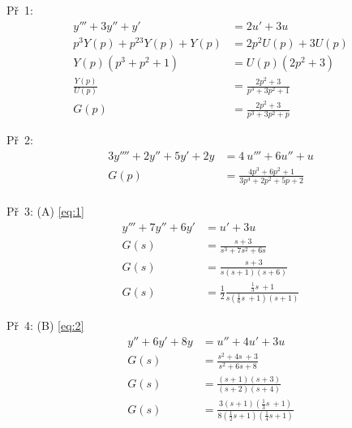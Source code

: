 

Př~1:
\begin{align}
y'''+3y''+y' & = 2u'+3u \\
p^3Y(p)+ p^23Y(p)+ Y(p) & = 2p^2U(p)+3U(p) \\
Y(p)(p^3+p^2+1) & = U(p)(2p^2+3) \\
\frac{Y(p)}{U(p)} & = \frac{2p^2+3}{p^3+3p^2+1} \\
G(p) & = \frac{2p^2 + 3} { p^3 + 3p^2 + p}
\end{align}

Př~2:
\begin{align}
3y''''+2y''+5y'+2y & = 4~u'''+6u''+u \\
G(p) & = \frac{4p^3+6p^2+1}{3p^4+2p^2+5p+2} \\
\end{align}

Př~3: (A) \ref{eq:1}
\begin{equation} \label{eq:1}
\begin{aligned}
y'''+7y''+6y' & = u'+3u \\
G(s) & = \frac{s+3}{s^3+7s^2+6s} \\
G(s) & = \frac{s+3}{s(s+1)(s+6)} \\
G(s) & = \frac12 \frac{\frac13 s~+ 1}{s (\frac16 s~+ 1) (s + 1)}
\end{aligned}
\end{equation}

Př~4: (B) \ref{eq:2}
\begin{align} \label{eq:2}
y'' + 6y'+8y &= u''+4u'+3u \\
G(s) & = \frac{s^2 + 4s~+ 3}{s^2+6s+8} \\
G(s) & = \frac{(s+1)(s+3)}{(s+2)(s+4)} \\
G(s) & = \frac{3(s+1)(\frac13 s~+ 1)}{8(\frac12 s+1)(\frac14 s+1)}
\end{align}
